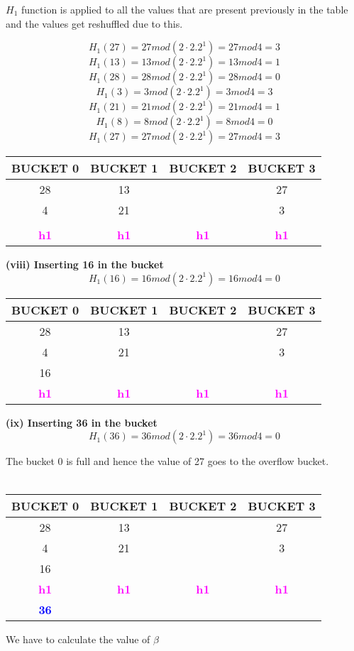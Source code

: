\newpage

$H_1$ function is applied to all the values that are present previously in the table and the values get reshuffled due to this.

\[H_1(27) = 27 mod (2 \cdot 2.2^1)  = 27 mod 4 = 3\]
\[H_1(13) = 13 mod (2 \cdot 2.2^1)  = 13 mod 4 = 1\]
\[H_1(28) = 28 mod (2 \cdot 2.2^1)  = 28 mod 4 = 0\]
\[H_1(3) = 3 mod (2 \cdot 2.2^1)  = 3 mod 4 = 3\]
\[H_1(21) = 21 mod (2 \cdot 2.2^1)  = 21 mod 4 = 1\]
\[H_1(8) = 8 mod (2 \cdot 2.2^1)  = 8 mod 4 = 0\]
\[H_1(27) = 27 mod (2 \cdot 2.2^1)  = 27 mod 4 = 3\]
\begin{center}
\begin{tabular}{ |c|c|c|c| } 
 \hline
 \textbf{\color{red}{P}} BUCKET 0 & BUCKET 1 & BUCKET 2 & BUCKET 3\\ [0.5ex] 
 \hline\hline
 \hline
  28 & 13 &  &27\\ 
   4 & 21 &  &3\\
    &  &  &\\
 \hline
 \hline
\textbf{\textcolor{magenta}{h1}} & \textbf{\textcolor{magenta}{h1}}& \textbf{\textcolor{magenta}{h1}}&\textbf{\textcolor{magenta}{h1}}\\ [0.5ex] 
 \hline
\end{tabular}
\end{center}
\textbf{(viii) Inserting 16 in the bucket}
\[H_1(16) = 16 mod (2 \cdot 2.2^1)  = 16 mod 4 = 0\]
\begin{center}
\begin{tabular}{ |c|c|c|c| } 
 \hline
 \textbf{\color{red}{P}} BUCKET 0 & BUCKET 1 & BUCKET 2 & BUCKET 3\\ [0.5ex] 
 \hline\hline
 \hline
  28 & 13 &  &27\\ 
   4 & 21 &  &3\\
    16 &  &  &\\
 \hline
 \hline
\textbf{\textcolor{magenta}{h1}} & \textbf{\textcolor{magenta}{h1}}& \textbf{\textcolor{magenta}{h1}}&\textbf{\textcolor{magenta}{h1}}\\ [0.5ex] 
 \hline
\end{tabular}
\end{center}
\textbf{(ix) Inserting 36 in the bucket}
\[H_1(36) = 36 mod (2 \cdot 2.2^1)  = 36 mod 4 = 0\]

The bucket 0 is full and hence the value of 27 goes to the overflow bucket.
\\
\\
\begin{center}
\begin{tabular}{ |c|c|c|c| } 
 \hline
 \textbf{\color{red}{P}} BUCKET 0 & BUCKET 1 & BUCKET 2 & BUCKET 3\\ [0.5ex] 
 \hline\hline
 \hline
  28 & 13 &  &27\\ 
   4 & 21 &  &3\\
    16 &  &  &\\
 \hline
 \hline
\textbf{\textcolor{magenta}{h1}} & \textbf{\textcolor{magenta}{h1}}& \textbf{\textcolor{magenta}{h1}}&\textbf{\textcolor{magenta}{h1}}\\ [0.5ex] 
 \hline
 \textbf{\textcolor{blue}{36}}
\end{tabular}
\end{center}
We have to calculate the value of $\beta$

